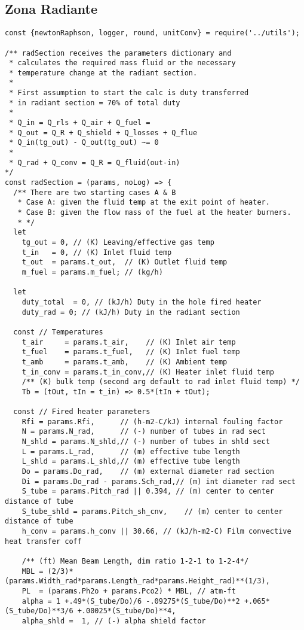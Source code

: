 \subsection{Zona Radiante}
\begin{verbatim}
const {newtonRaphson, logger, round, unitConv} = require('../utils');

/** radSection receives the parameters dictionary and
 * calculates the required mass fluid or the necessary
 * temperature change at the radiant section.
 * 
 * First assumption to start the calc is duty transferred
 * in radiant section = 70% of total duty
 * 
 * Q_in = Q_rls + Q_air + Q_fuel =
 * Q_out = Q_R + Q_shield + Q_losses + Q_flue
 * Q_in(tg_out) - Q_out(tg_out) ~= 0
 * 
 * Q_rad + Q_conv = Q_R = Q_fluid(out-in)
*/
const radSection = (params, noLog) => {
  /** There are two starting cases A & B
   * Case A: given the fluid temp at the exit point of heater.
   * Case B: given the flow mass of the fuel at the heater burners. 
   * */
  let 
    tg_out = 0, // (K) Leaving/effective gas temp
    t_in   = 0, // (K) Inlet fluid temp
    t_out  = params.t_out,  // (K) Outlet fluid temp
    m_fuel = params.m_fuel; // (kg/h)

  let 
    duty_total  = 0, // (kJ/h) Duty in the hole fired heater
    duty_rad = 0; // (kJ/h) Duty in the radiant section
  
  const // Temperatures
    t_air     = params.t_air,    // (K) Inlet air temp
    t_fuel    = params.t_fuel,   // (K) Inlet fuel temp
    t_amb     = params.t_amb,    // (K) Ambient temp
    t_in_conv = params.t_in_conv,// (K) Heater inlet fluid temp
    /** (K) bulk temp (second arg default to rad inlet fluid temp) */
    Tb = (tOut, tIn = t_in) => 0.5*(tIn + tOut);

  const // Fired heater parameters
    Rfi = params.Rfi,      // (h-m2-C/kJ) internal fouling factor
    N = params.N_rad,      // (-) number of tubes in rad sect
    N_shld = params.N_shld,// (-) number of tubes in shld sect
    L = params.L_rad,      // (m) effective tube length
    L_shld = params.L_shld,// (m) effective tube length
    Do = params.Do_rad,    // (m) external diameter rad section
    Di = params.Do_rad - params.Sch_rad,// (m) int diameter rad sect
    S_tube = params.Pitch_rad || 0.394, // (m) center to center distance of tube
    S_tube_shld = params.Pitch_sh_cnv,    // (m) center to center distance of tube
    h_conv = params.h_conv || 30.66, // (kJ/h-m2-C) Film convective heat transfer coff

    /** (ft) Mean Beam Length, dim ratio 1-2-1 to 1-2-4*/
    MBL = (2/3)*(params.Width_rad*params.Length_rad*params.Height_rad)**(1/3),
    PL  = (params.Ph2o + params.Pco2) * MBL, // atm-ft
    alpha = 1 +.49*(S_tube/Do)/6 -.09275*(S_tube/Do)**2 +.065*(S_tube/Do)**3/6 +.00025*(S_tube/Do)**4,
    alpha_shld =  1, // (-) alpha shield factor
    

\end{verbatim}
